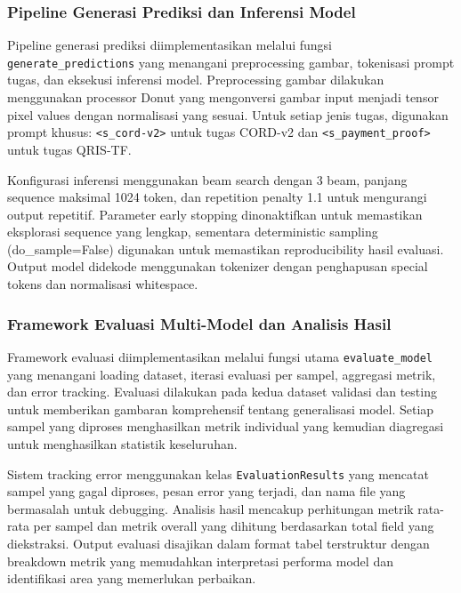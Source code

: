 \subsubsection{Pipeline Generasi Prediksi dan Inferensi Model}

Pipeline generasi prediksi diimplementasikan melalui fungsi \texttt{generate\_predictions} yang menangani preprocessing gambar, tokenisasi prompt tugas, dan eksekusi inferensi model. Preprocessing gambar dilakukan menggunakan processor Donut yang mengonversi gambar input menjadi tensor pixel values dengan normalisasi yang sesuai. Untuk setiap jenis tugas, digunakan prompt khusus: \texttt{<s\_cord-v2>} untuk tugas CORD-v2 dan \texttt{<s\_payment\_proof>} untuk tugas QRIS-TF.

Konfigurasi inferensi menggunakan beam search dengan 3 beam, panjang sequence maksimal 1024 token, dan repetition penalty 1.1 untuk mengurangi output repetitif. Parameter early stopping dinonaktifkan untuk memastikan eksplorasi sequence yang lengkap, sementara deterministic sampling (do\_sample=False) digunakan untuk memastikan reproducibility hasil evaluasi. Output model didekode menggunakan tokenizer dengan penghapusan special tokens dan normalisasi whitespace.

\subsubsection{Framework Evaluasi Multi-Model dan Analisis Hasil}

Framework evaluasi diimplementasikan melalui fungsi utama \texttt{evaluate\_model} yang menangani loading dataset, iterasi evaluasi per sampel, aggregasi metrik, dan error tracking. Evaluasi dilakukan pada kedua dataset validasi dan testing untuk memberikan gambaran komprehensif tentang generalisasi model. Setiap sampel yang diproses menghasilkan metrik individual yang kemudian diagregasi untuk menghasilkan statistik keseluruhan.

Sistem tracking error menggunakan kelas \texttt{EvaluationResults} yang mencatat sampel yang gagal diproses, pesan error yang terjadi, dan nama file yang bermasalah untuk debugging. Analisis hasil mencakup perhitungan metrik rata-rata per sampel dan metrik overall yang dihitung berdasarkan total field yang diekstraksi. Output evaluasi disajikan dalam format tabel terstruktur dengan breakdown metrik yang memudahkan interpretasi performa model dan identifikasi area yang memerlukan perbaikan.
